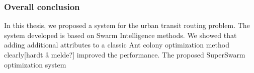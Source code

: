 \subsubsection*{Overall conclusion}

In this thesis, we proposed a system for the urban transit routing problem. The system developed is based on  Swarm Intelligence methods. We showed that adding additional attributes to a classic Ant colony optimization method clearly[hardt å melde?] improved the performance. The proposed SuperSwarm optimization system 








